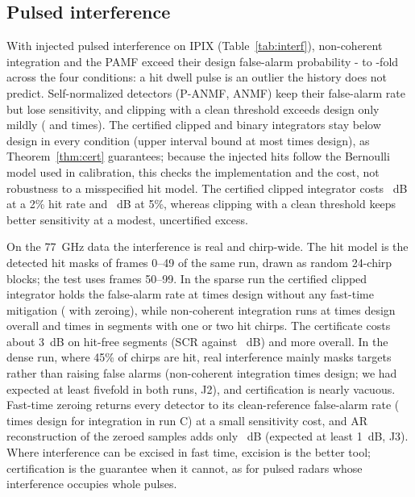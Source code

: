 \documentclass[journal]{IEEEtran}
\begin{document}
\subsection{Pulsed interference}\label{sec:interf}
\begin{table}[!t]
\centering\footnotesize
\caption{Pulsed interference at $\alpha=0.01$: measured $P_{\rm fa}/\alpha$ and SCR (dB) for $P_{\rm d}=0.5$. IPIX: injected, 30~dB, hit probability $p$ per pulse. 77~GHz run C: real interference, 4.6\% of chirps hit, no fast-time mitigation. Bold: $P_{\rm fa}/\alpha>1.5$.}
\label{tab:interf}
\setlength{\tabcolsep}{2.4pt}

\end{table}
With injected pulsed interference on IPIX (Table~\ref{tab:interf}), non-coherent integration and the PAMF exceed their design false-alarm probability \IPfaMinAll- to \IPfaMaxAll-fold across the four conditions: a hit dwell pulse is an outlier the history does not predict. Self-normalized detectors (P-ANMF, ANMF) keep their false-alarm rate but lose sensitivity, and clipping with a clean threshold exceeds design only mildly (\IClipPfaTwo{} and \IClipPfaFive{} times). The certified clipped and binary integrators stay below design in every condition (upper interval bound at most \ICertUpperMax{} times design), as Theorem~\ref{thm:cert} guarantees; because the injected hits follow the Bernoulli model used in calibration, this checks the implementation and the cost, not robustness to a misspecified hit model. The certified clipped integrator costs \ICertCostTwo~dB at a 2\% hit rate and \ICertCostFive~dB at 5\%, whereas clipping with a clean threshold keeps better sensitivity at a modest, uncertified excess.

On the 77~GHz data the interference is real and chirp-wide. The hit model is the detected hit masks of frames 0--49 of the same run, drawn as random 24-chirp blocks; the test uses frames 50--99. In the sparse run the certified clipped integrator holds the false-alarm rate at \JCertPfaC{} times design without any fast-time mitigation (\JCertPfaCZ{} with zeroing), while non-coherent integration runs at \JDinPfaC{} times design overall and \JDinPfaCone{} times in segments with one or two hit chirps. The certificate costs about 3~dB on hit-free segments (SCR \JCertScrCclean{} against \JClipScrCclean~dB) and more overall. In the dense run, where 45\% of chirps are hit, real interference mainly masks targets rather than raising false alarms (non-coherent integration \JDinPfaA{} times design; we had expected at least fivefold in both runs, J2), and certification is nearly vacuous. Fast-time zeroing returns every detector to its clean-reference false-alarm rate (\JZPfaC{} times design for integration in run C) at a small sensitivity cost, and AR reconstruction of the zeroed samples adds only \JZarGainA~dB (expected at least 1~dB, J3). Where interference can be excised in fast time, excision is the better tool; certification is the guarantee when it cannot, as for pulsed radars whose interference occupies whole pulses.
\end{document}
